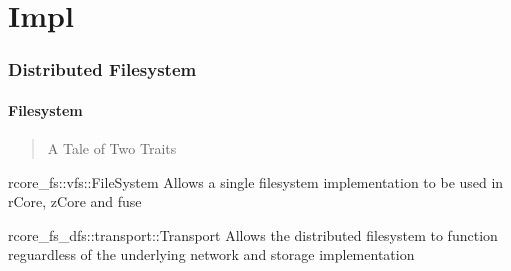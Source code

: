 \documentclass{ctexbeamer}
\begin{document}
\section{Impl}
\begin{frame}
\frametitle{Distributed Filesystem}
\framesubtitle{Filesystem}
\begin{verse}
  A Tale of Two Traits
\end{verse}
\begin{block}{rcore\_fs::vfs::FileSystem}
  Allows a single filesystem implementation to be used in rCore, zCore and fuse
\end{block}
\begin{block}{rcore\_fs\_dfs::transport::Transport}
  Allows the distributed filesystem to function reguardless of the underlying network and storage implementation
\end{block}
\end{frame}

\section{}
\frame{\titlepage}
\end{document}
